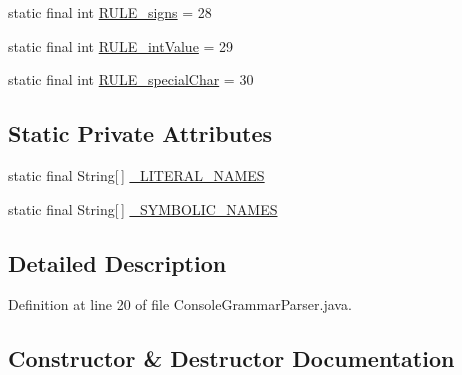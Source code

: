 \begin{DoxyCompactItemize}
\item 
static final int \hyperlink{classgov_1_1nasa_1_1jpf_1_1inspector_1_1client_1_1parser_1_1_console_grammar_parser_a928a86d8ddcc1765dae679ad1e9023cf}{R\+U\+L\+E\+\_\+signs} = 28
\item 
static final int \hyperlink{classgov_1_1nasa_1_1jpf_1_1inspector_1_1client_1_1parser_1_1_console_grammar_parser_a884ea99dccf01df611fbb266001b411d}{R\+U\+L\+E\+\_\+int\+Value} = 29
\item 
static final int \hyperlink{classgov_1_1nasa_1_1jpf_1_1inspector_1_1client_1_1parser_1_1_console_grammar_parser_a00a5bb486d51534f590bbf156472289d}{R\+U\+L\+E\+\_\+special\+Char} = 30
\end{DoxyCompactItemize}
\subsection*{Static Private Attributes}
\begin{DoxyCompactItemize}
\item 
static final String\mbox{[}$\,$\mbox{]} \hyperlink{classgov_1_1nasa_1_1jpf_1_1inspector_1_1client_1_1parser_1_1_console_grammar_parser_a0bdc50440bf10cf36a363450d31f5d37}{\+\_\+\+L\+I\+T\+E\+R\+A\+L\+\_\+\+N\+A\+M\+ES}
\item 
static final String\mbox{[}$\,$\mbox{]} \hyperlink{classgov_1_1nasa_1_1jpf_1_1inspector_1_1client_1_1parser_1_1_console_grammar_parser_abcc03573e93008f6785c7f6a74f5f332}{\+\_\+\+S\+Y\+M\+B\+O\+L\+I\+C\+\_\+\+N\+A\+M\+ES}
\end{DoxyCompactItemize}


\subsection{Detailed Description}


Definition at line 20 of file Console\+Grammar\+Parser.\+java.



\subsection{Constructor \& Destructor Documentation}
